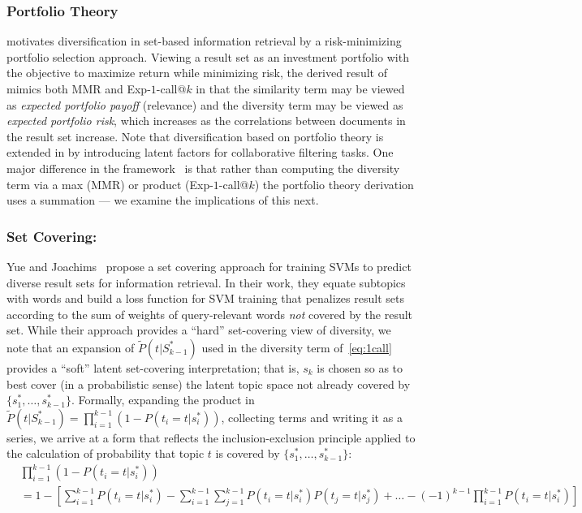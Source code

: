 \subsubsection{Portfolio Theory}
\cite{wang09PortfolioTheory} motivates
diversification in set-based information retrieval by a
risk-minimizing portfolio selection approach.  Viewing a result set as
an investment portfolio with the objective to maximize return while
minimizing risk, the derived result of~\cite{wang09PortfolioTheory}
mimics both MMR and Exp-$1$-call@$k$ in that the similarity term may
be viewed as \emph{expected portfolio payoff} (relevance) and the
diversity term may be viewed as \emph{expected portfolio risk}, which
increases as the correlations between documents in the result set
increase. Note that diversification based on portfolio theory is extended in \cite{Shi:SIGIR2012} by introducing latent factors for collaborative filtering tasks. One major difference in the framework~\cite{wang09PortfolioTheory} is that rather than
computing the diversity term via a max (MMR) or product
(Exp-$1$-call@$k$) the portfolio theory derivation uses a summation
--- we examine the implications of this next.

\subsubsection{Set Covering:}
Yue and Joachims~\cite{yue081224Predicting} propose a set covering
approach for training SVMs to predict diverse result sets for
information retrieval.  In their work, they equate subtopics with
words and build a loss function for SVM training that penalizes
result sets according to the sum of weights of query-relevant words
\emph{not} covered by the result set.  While their approach provides a
``hard'' set-covering view of diversity, we note that an expansion of
$\tilde{P}(t | S_{k-1}^*)$ used in the diversity term
of~\eqref{eq:1call} provides a ``soft'' latent set-covering
interpretation; that is, $s_k$ is chosen so as to best cover (in a
probabilistic sense) the latent topic space not already covered by $\{
s_1^*,\ldots,s_{k-1}^* \}$.  Formally, expanding the product in
$\tilde{P}(t | S_{k-1}^*) = \prod_{i=1}^{k-1} \left(1 -
P(t_{i}=t|s_{i}^{*})\right)$, collecting terms and writing it as a
series, we arrive at a form that reflects the inclusion-exclusion
principle applied to the calculation of probability that topic $t$ is
covered by $\{ s_1^*,\ldots,s_{k-1}^* \}$:
\begin{align}
& \prod_{i=1}^{k-1} \left(1 - P(t_{i}=t|s_{i}^{*})\right) \nonumber \\
& = 1 - \left[ \sum_{i=1}^{k-1} P(t_{i}= t|s_{i}^{*}) - \sum_{i=1}^{k-1}\sum_{j=1}^{k-1}P(t_{i}= t|s_{i}^{*})P(t_{j}= t|s_{j}^{*}) + \dots - (-1)^{k-1}\prod_{i=1}^{k-1}P(t_{i}=t|s_{i}^{*})\right] \label{eq:setcover}
\end{align}

